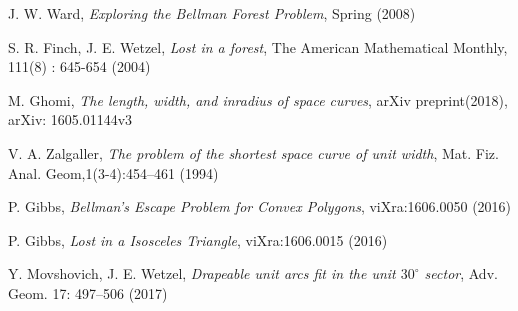 \documentclass[11pt,letter]{article}
\begin{document}
\begin{thebibliography}{99}


    J. W. Ward,
    \textit{Exploring the Bellman Forest Problem},
    Spring (2008)

	S. R. Finch, J. E. Wetzel,
	\textit{Lost in a forest},
	The American Mathematical Monthly, 111(8) : 645-654 (2004)

 	M. Ghomi,
	\textit{The length, width, and inradius of space curves},
	arXiv preprint(2018), arXiv: 1605.01144v3

	V. A. Zalgaller,
	\textit{ The problem of the shortest space curve of unit width},
	 Mat. Fiz. Anal. Geom,1(3-4):454–461 (1994)

	P. Gibbs, 
	\textit{Bellman’s Escape Problem for Convex Polygons},
	viXra:1606.0050 (2016)

	P. Gibbs,
	\textit{Lost in a Isosceles Triangle},
	viXra:1606.0015 (2016)

	Y. Movshovich, J. E. Wetzel,
	\textit{Drapeable unit arcs fit in the unit $30^\circ$ sector},
	 Adv. Geom. 17: 497–506 (2017)


\end{thebibliography}
\end{document}
